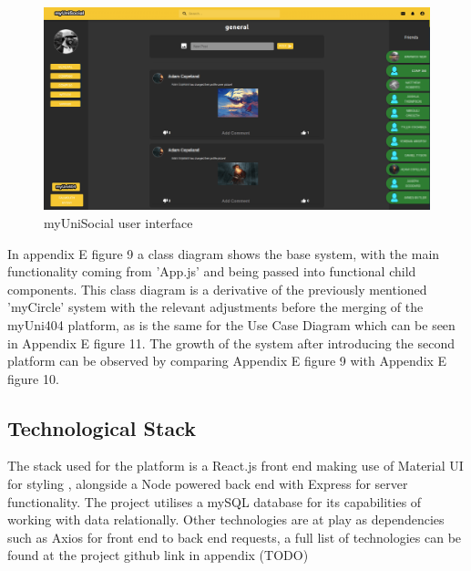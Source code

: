 \documentclass[lettersize,journal]{IEEEtran}
\begin{document}
	 \begin{figure}[h!]
                \includegraphics[width=\linewidth]{images/myunisocial.PNG}
                \caption{myUniSocial user interface}
                \label{figure 2}
        \end{figure}


        In appendix E figure 9 a class diagram shows the base system, with the main functionality coming from 'App.js' and being passed into
        functional child components. This class diagram is a derivative of the previously mentioned 'myCircle' system with the relevant adjustments before the merging of the myUni404 platform,
        as is the same for the Use Case Diagram which can be seen in Appendix E figure 11. The growth of the system after introducing the second platform can be observed by comparing Appendix E figure 9
	 with Appendix E figure 10.

        \subsection{Technological Stack}
        The stack used for the platform is a React.js front end \cite{React} making use of Material UI for styling \cite{Mui}, alongside a Node powered back end \cite{Node} with Express for server
    functionality\cite{Express}. The project utilises a mySQL database for its capabilities of working with data relationally. Other technologies are at play as dependencies such as Axios for front end to
     back end requests, a full list of technologies can be found at the project github link in appendix (TODO)
\end{document}

